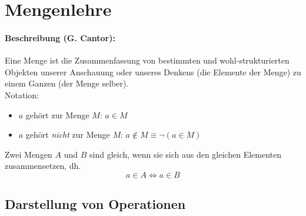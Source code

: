 %

\section{Mengenlehre}
\paragraph{Beschreibung (G. Cantor):}\glqq Eine Menge ist die Zusammenfassung von bestimmten und wohl-strukturierten Objekten unserer Anschauung oder unseres Denkens
(die Elemente der Menge) zu einem Ganzen (der Menge selber).\grqq\\
Notation:
\begin{itemize}
\item $a$ gehört zur Menge $M$: $a\in M$
\item $a$ gehört \emph{nicht} zur Menge $M$: $a\notin M\equiv \neg(a\in M)$
\end{itemize}
Zwei Mengen $A$ und $B$ sind gleich, wenn sie sich aus den gleichen Elementen zusammensetzen, dh.
\[
a\in A \Leftrightarrow a\in B
\]
\subsection{Darstellung von Operationen}
